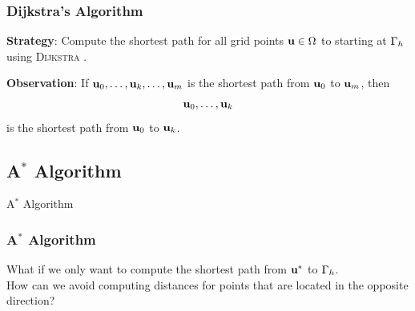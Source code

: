 \documentclass[aspectratio=169,handout]{beamer}
\begin{document}
\begin{frame}
	\frametitle{Dijkstra's Algorithm}
	\textbf{Strategy}: Compute the shortest path for all grid points $\mathbf{u} \in \Omega$ to starting at $\Gamma_h$ using \textsc{Dijkstra} \cite{dijkstra-1959}.\\
	\vspace{1cm}
	
	\textbf{Observation}: If $\mathbf{u}_0, \ldots, \mathbf{u}_k, \ldots,\mathbf{u}_m$ is the shortest path from $\mathbf{u}_0$ to $\mathbf{u}_m$, then
		\begin{equation*}
			\mathbf{u}_0, \ldots, \mathbf{u}_k
		\end{equation*}
		is the shortest path from $\mathbf{u}_0$ to $\mathbf{u}_k$.\\
	\vspace{1cm}
	
\end{frame}

\subsection{A$^*$ Algorithm}
\begin{frame}[plain]
	\begin{center}
		{\color{myblue} \huge A$^*$ Algorithm}
	\end{center}
\end{frame}

\begin{frame}
	\frametitle{A$^*$ Algorithm}
	What if we only want to compute the shortest path from $\mathbf{u}^*$ to $\Gamma_h$.\\
	\vspace{1cm}
	How can we avoid computing distances for points that are located in the opposite direction?
\end{frame}

%	

\end{document}
